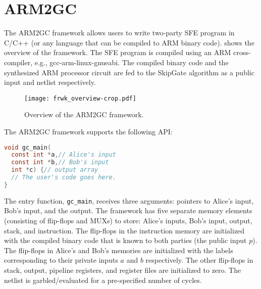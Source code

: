 \section{ARM2GC}
The ARM2GC framework allows users to write two-party SFE program in C/C++ (or any language that can be compiled to ARM binary code).
 shows the overview of the framework.
The SFE program is compiled using an ARM cross-compiler, e.g., gcc-arm-linux-gnueabi.
The compiled binary code and the synthesized ARM processor circuit are fed to the SkipGate algorithm as a public input and netlist respectively.

\begin{figure}[t]
\centering
\texttt{[image: frwk\_overview-crop.pdf]}
\caption{Overview of the ARM2GC framework.}\label{fig:frwk_overview}
\end{figure}

The ARM2GC framework supports the following API:
\begin{lstlisting}[language=C,basicstyle=\ttfamily,keywordstyle=\color{blue}\ttfamily,stringstyle=\color{red}\ttfamily,commentstyle=\color{CommentColor}\ttfamily]
void gc_main(
  const int *a,// Alice's input
  const int *b,// Bob's input
  int *c) {// output array
  // The user's code goes here.
}
\end{lstlisting}

The entry function, \texttt{gc\_main}, receives three arguments: pointers to Alice's input, Bob's input, and the output.
The framework has five separate memory elements (consisting of flip-flops and MUXs) to store: Alice's inputs, Bob's input, output, stack, and instruction.
The flip-flops in the instruction memory are initialized with the compiled binary code that is known to both parties (the public input $p$).
The flip-flops in Alice's and Bob's memories are initialized with the labels corresponding to their private inputs $a$ and $b$ respectively.
The other flip-flops in stack, output, pipeline registers, and register files are initialized to zero.
The netlist is garbled/evaluated for a pre-specified number of cycles.

